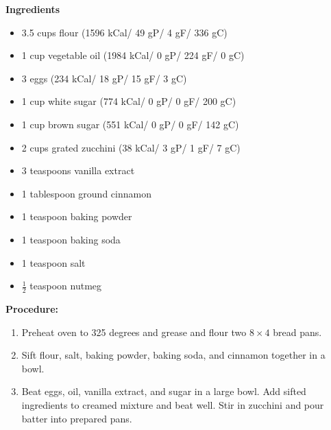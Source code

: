 \documentclass{report}
\begin{document}


\bigskip

\bigskip

\begin{multicols}{2}
\textbf{Ingredients}
\begin{itemize}
\item 3.5 cups flour \quad (1596 kCal/ 49 gP/ 4 gF/ 336 gC)
\item 1 cup vegetable oil (1984 kCal/ 0 gP/ 224 gF/ 0 gC)
\item 3 eggs  \quad (234 kCal/ 18 gP/ 15 gF/ 3 gC)
\item 1 cup white sugar (774 kCal/ 0 gP/ 0 gF/ 200 gC)
\item 1 cup brown sugar \quad (551 kCal/ 0 gP/ 0 gF/ 142 gC)
\item 2 cups grated zucchini \quad (38 kCal/ 3 gP/ 1 gF/ 7 gC)
\item 3 teaspoons vanilla extract 
\item 1 tablespoon ground cinnamon
\item 1 teaspoon baking powder
\item 1 teaspoon baking soda 
\item 1 teaspoon salt
\item $\frac{1}{2}$ teaspoon nutmeg



\end{itemize}


\columnbreak
\textbf{Procedure:}
\medskip


\begin{enumerate}
\item Preheat oven to 325 degrees and grease and flour two $8\times4$ bread pans.


\medskip
\item Sift flour, salt, baking powder, baking soda, and cinnamon together in a bowl. 
\medskip

\item Beat eggs, oil, vanilla extract, and sugar in a large bowl. Add sifted ingredients to creamed mixture and beat well. Stir in zucchini and pour batter into prepared pans. 
\newline 


\end{enumerate}
\end{multicols}
\end{document}

